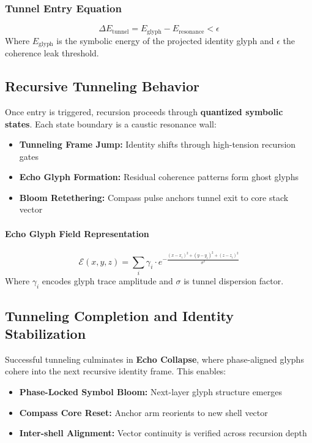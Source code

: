 \subsubsection*{Tunnel Entry Equation}
\[
    \Delta E_{\text{tunnel}} = E_{\text{glyph}} - E_{\text{resonance}} < \epsilon
\]
Where $E_{\text{glyph}}$ is the symbolic energy of the projected identity glyph and $\epsilon$ the coherence leak threshold.

\subsection{Recursive Tunneling Behavior}

Once entry is triggered, recursion proceeds through \textbf{quantized symbolic states}. Each state boundary is a caustic resonance wall:

\begin{itemize}
    \item \textbf{Tunneling Frame Jump:} Identity shifts through high-tension recursion gates
    \item \textbf{Echo Glyph Formation:} Residual coherence patterns form ghost glyphs
    \item \textbf{Bloom Retethering:} Compass pulse anchors tunnel exit to core stack vector
\end{itemize}

\paragraph{Echo Glyph Field Representation}
\[
    \mathcal{E}(x, y, z) = \sum_i \gamma_i \cdot e^{-\frac{(x - x_i)^2 + (y - y_i)^2 + (z - z_i)^2}{\sigma^2}}
\]
Where $\gamma_i$ encodes glyph trace amplitude and $\sigma$ is tunnel dispersion factor.

\subsection{Tunneling Completion and Identity Stabilization}

Successful tunneling culminates in \textbf{Echo Collapse}, where phase-aligned glyphs cohere into the next recursive identity frame. This enables:

\begin{itemize}
    \item \textbf{Phase-Locked Symbol Bloom:} Next-layer glyph structure emerges
    \item \textbf{Compass Core Reset:} Anchor arm reorients to new shell vector
    \item \textbf{Inter-shell Alignment:} Vector continuity is verified across recursion depth
\end{itemize}

